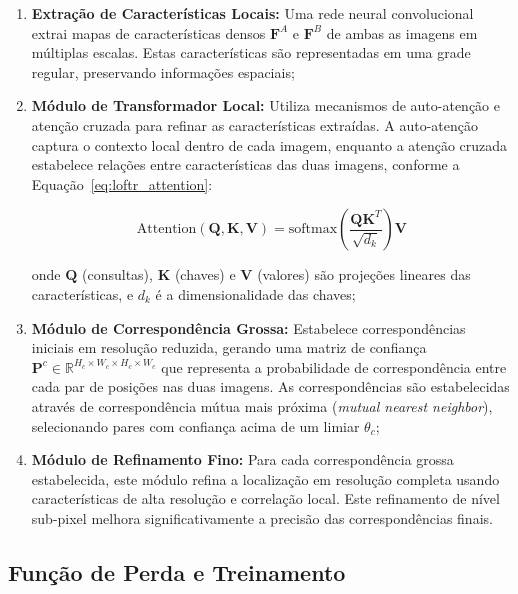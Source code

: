\begin{enumerate}
    \item \textbf{Extração de Características Locais:} Uma rede neural convolucional extrai mapas de características densos $\mathbf{F}^A$ e $\mathbf{F}^B$ de ambas as imagens em múltiplas escalas. Estas características são representadas em uma grade regular, preservando informações espaciais;
    
    \item \textbf{Módulo de Transformador Local:} Utiliza mecanismos de auto-atenção e atenção cruzada para refinar as características extraídas. A auto-atenção captura o contexto local dentro de cada imagem, enquanto a atenção cruzada estabelece relações entre características das duas imagens, conforme a Equação~\ref{eq:loftr_attention}:
    
    \begin{equation}
    \label{eq:loftr_attention}
    \text{Attention}(\mathbf{Q}, \mathbf{K}, \mathbf{V}) = \text{softmax}\left(\frac{\mathbf{QK}^T}{\sqrt{d_k}}\right)\mathbf{V}
    \end{equation}
    
    \noindent onde $\mathbf{Q}$ (consultas), $\mathbf{K}$ (chaves) e $\mathbf{V}$ (valores) são projeções lineares das características, e $d_k$ é a dimensionalidade das chaves;
    
    \item \textbf{Módulo de Correspondência Grossa:} Estabelece correspondências iniciais em resolução reduzida, gerando uma matriz de confiança $\mathbf{P}^c \in \mathbb{R}^{H_c \times W_c \times H_c \times W_c}$ que representa a probabilidade de correspondência entre cada par de posições nas duas imagens. As correspondências são estabelecidas através de correspondência mútua mais próxima (\textit{mutual nearest neighbor}), selecionando pares com confiança acima de um limiar $\theta_c$;
    
    \item \textbf{Módulo de Refinamento Fino:} Para cada correspondência grossa estabelecida, este módulo refina a localização em resolução completa usando características de alta resolução e correlação local. Este refinamento de nível sub-pixel melhora significativamente a precisão das correspondências finais.
\end{enumerate}

\subsection*{Função de Perda e Treinamento}

